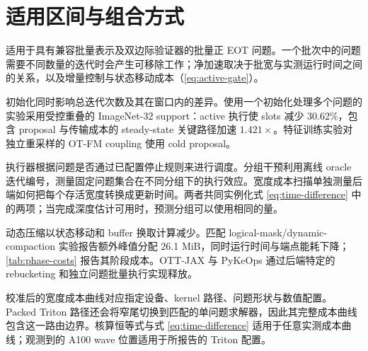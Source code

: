 \section{适用区间与组合方式}
\label{sec:scope}

\policy{} 适用于具有兼容批量表示及双边际验证器的批量正 EOT 问题。一个批次中的问题需要不同数量的迭代时会产生可移除工作；净加速取决于批宽与实测运行时间之间的关系，以及增量控制与状态移动成本（\cref{eq:active-gate}）。

初始化同时影响总迭代次数及其在窗口内的差异。使用一个初始化处理多个问题的实验采用受控重叠的 ImageNet-32 support：active 执行使 slots 减少 30.62\%，包含 proposal 与传输成本的 steady-state 关键路径加速 $1.421\times$。特征训练实验对独立重采样的 OT-FM coupling 使用 cold proposal。

执行器根据问题是否通过已配置停止规则来进行调度。分组干预利用离线 oracle 迭代编号，测量固定问题集合在不同分组下的执行效应。宽度成本扫描单独测量后端如何把每个存活宽度转换成更新时间。两者共同实例化式 \eqref{eq:time-difference} 中的两项；当完成深度估计可用时，预测分组可以使用相同的量。

动态压缩以状态移动和 buffer 换取计算减少。匹配 logical-mask/dynamic-compaction 实验报告额外峰值分配 26.1 MiB，同时运行时间与端点能耗下降；\cref{tab:phase-costs} 报告其阶段成本。OTT-JAX 与 PyKeOps 通过后端特定的 rebucketing 和独立问题批量执行实现释放。

校准后的宽度成本曲线对应指定设备、kernel 路径、问题形状与数值配置。Packed Triton 路径还会将窄尾切换到匹配的单问题求解器，因此其完整成本曲线包含这一路由边界。核算恒等式与式 \eqref{eq:time-difference} 适用于任意实测成本曲线；观测到的 A100 wave 位置适用于所报告的 Triton 配置。
